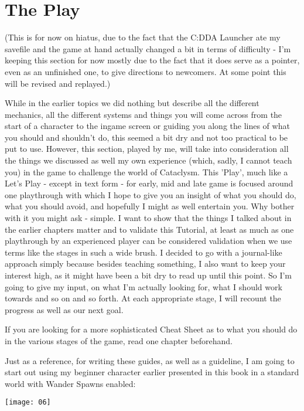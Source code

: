 \chapter{The Play}

(This is for now on hiatus, due to the fact that the C:DDA Launcher ate my savefile and the game at hand actually changed a bit in terms of difficulty - I'm keeping this section for now mostly due to the fact that it does serve as a pointer, even as an unfinished one, to give directions to newcomers. At some point this will be revised and replayed.)

While in the earlier topics we did nothing but describe all the different mechanics, all the different systems and things you will come across from the start of a character to the ingame screen or guiding you along the lines of what you should and shouldn't do, this seemed a bit dry and not too practical to be put to use. However, this section, played by me, will take into consideration all the things we discussed as well my own experience (which, sadly, I cannot teach you) in the game to challenge the world of Cataclysm. This 'Play', much like a Let's Play - except in text form - for early, mid and late game is focused around one playthrough with which I hope to give you an insight of what you should do, what you should avoid, and hopefully I might as well entertain you. Why bother with it you might ask - simple. I want to show that the things I talked about in the earlier chapters matter and to validate this Tutorial, at least as much as one playthrough by an experienced player can be considered validation when we use terms like the stages in such a wide brush. I decided to go with a journal-like approach simply because besides teaching something, I also want to keep your interest high, as it might have been a bit dry to read up until this point. So I'm going to give my input, on what I'm actually looking for, what I should work towards and so on and so forth. At each appropriate stage, I will recount the progress as well as our next goal.

If you are looking for a more sophisticated Cheat Sheet as to what you should do in the various stages of the game, read one chapter beforehand.

Just as a reference, for writing these guides, as well as a guideline, I am going to start out using my beginner character earlier presented in this book in a standard world with Wander Spawns enabled:

\texttt{[image: 06]}

